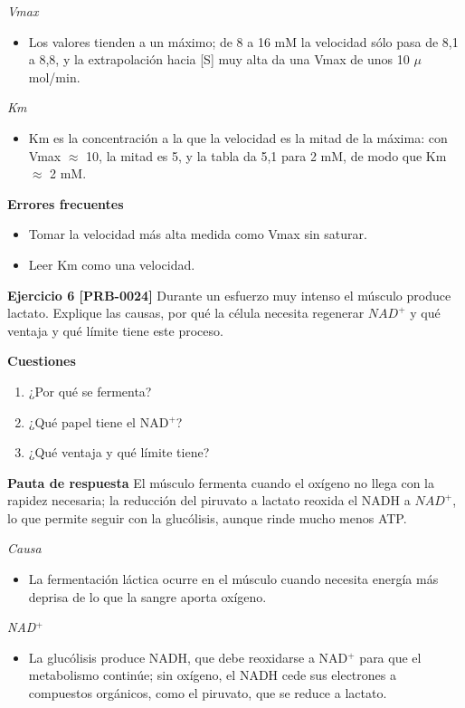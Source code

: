 \documentclass{book}
\begin{document}
\noindent\textit{Vmax}
\begin{itemize}
\item Los valores tienden a un máximo; de 8 a 16 mM la velocidad sólo pasa de 8,1 a 8,8, y la extrapolación hacia [S] muy alta da una Vmax de unos 10 \(\mu\)mol/min.
\end{itemize}

\noindent\textit{Km}
\begin{itemize}
\item Km es la concentración a la que la velocidad es la mitad de la máxima: con Vmax \(\approx\) 10, la mitad es 5, y la tabla da 5,1 para 2 mM, de modo que Km \(\approx\) 2 mM.
\end{itemize}

\noindent\textbf{Errores frecuentes}
\begin{itemize}
\item Tomar la velocidad más alta medida como Vmax sin saturar.
\item Leer Km como una velocidad.
\end{itemize}

\noindent\textbf{Ejercicio 6 [PRB-0024]}
Durante un esfuerzo muy intenso el músculo produce lactato. Explique las causas, por qué la célula necesita regenerar \(NAD^{+}\) y qué ventaja y qué límite tiene este proceso.


\noindent\textbf{Cuestiones}
\begin{enumerate}
\item ¿Por qué se fermenta?
\item ¿Qué papel tiene el NAD\({}^{+}\)?
\item ¿Qué ventaja y qué límite tiene?
\end{enumerate}

\noindent\textbf{Pauta de respuesta}
El músculo fermenta cuando el oxígeno no llega con la rapidez necesaria; la reducción del piruvato a lactato reoxida el NADH a \(NAD^{+}\), lo que permite seguir con la glucólisis, aunque rinde mucho menos ATP.


\noindent\textit{Causa}
\begin{itemize}
\item La fermentación láctica ocurre en el músculo cuando necesita energía más deprisa de lo que la sangre aporta oxígeno.
\end{itemize}

\noindent\textit{NAD\({}^{+}\)}
\begin{itemize}
\item La glucólisis produce NADH, que debe reoxidarse a NAD\({}^{+}\) para que el metabolismo continúe; sin oxígeno, el NADH cede sus electrones a compuestos orgánicos, como el piruvato, que se reduce a lactato.
\end{itemize}
\end{document}
